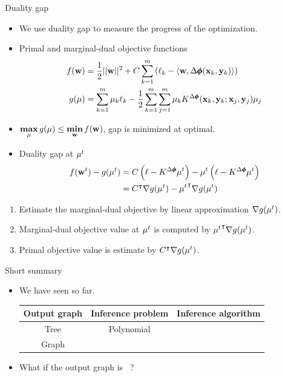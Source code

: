 \documentclass[first=dgreen,second=purple,logo=red]{aaltoslides}
\begin{document}
%
\begin{frame}{Duality gap}
	\begin{itemize}\footnotesize
		\item We use duality gap to measure the progress of the optimization.
		\item Primal and marginal-dual objective functions
		\begin{align*}\footnotesize
			f(\mathbf {w}) &= \frac{1}{2}||\mathbf {w}||^2 + C\sum_{k=1}^m\left(\ell_k-\langle \mathbf {w}, \Delta\pmb \phi(\mathbf {x}_k,\mathbf {y}_k) \rangle\right)\\
			g(\mathbf {\mu}) &= \sum_{k=1}^m\mu_k\ell_k - \frac{1}{2}\sum_{k=1}^m\sum_{j=1}^m\mu_kK^{\Delta\pmb \phi}(\mathbf {x}_k,\mathbf {y}_k;\mathbf {x}_j,\mathbf {y}_j)\mu_j
		\end{align*}
		\item $\underset{\mathbf {\mu}}{\textbf{max}}\,g(\mathbf {\mu})\le \underset{\mathbf {w}}{\textbf{min}}\,f(\mathbf {w})$, gap is minimized at optimal.
		\item Duality gap at $\mathbf {\mu}^t$
		\begin{align*}\footnotesize
			f(\mathbf {w}^t) - g(\mathbf {\mu}^t) &= C\left(\mathbf {\ell}-K^{\Delta\pmb \phi}\mathbf {\mu}^t\right) - \mathbf {\mu}^t\left(\mathbf {\ell}-K^{\Delta\pmb \phi}\mathbf {\mu}^t\right)\\
			&= C^{\intercal} \nabla g(\mathbf {\mu}^t) -{\mathbf {\mu}^t} ^{\intercal} \nabla g(\mathbf {\mu}^t)
		\end{align*}
	\end{itemize}
		\begin{enumerate}\footnotesize
			\item Estimate the marginal-dual objective by linear approximation $\nabla g(\mathbf {\mu}^t)$.
			\item Marginal-dual objective value at $\mathbf {\mu}^t$ is computed by ${\mathbf {\mu}^t} ^{\intercal} \nabla g(\mathbf {\mu}^t)$.
			\item Primal objective value is estimate by $C^{\intercal} \nabla g(\mathbf {\mu}^t)$.
		\end{enumerate}
\end{frame}

%
\begin{frame}{Short summary}
	\begin{itemize}\footnotesize
		\item We have seen so far. 
		\begin{tabular}{|c|c|c|}
			\hline
			\footnotesize
			 Output graph & Inference problem & Inference algorithm \\ \hline
			 Tree & Polynomial & \dpg\ \cite{Rousu07}  \\
			 Graph & \nphard & \lbp\ \cite{su10structured}  \\ \hline
		\end{tabular}
		\item What if the output graph is \daggraph\ ?
	\end{itemize}
\end{frame}
\end{document}
